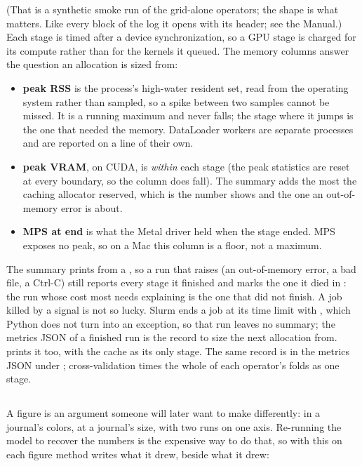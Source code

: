 (That is a synthetic smoke run of the grid-alone operators; the shape is what matters. Like every block of the log it opens with its \opt{[NAME]} header; see the Manual.) Each stage is timed after a device synchronization, so a GPU stage is charged for its compute rather than for the kernels it queued. The memory columns answer the question an allocation is sized from:

\begin{itemize}
  \item \textbf{peak RSS} is the process's high-water resident set, read from the operating system rather than sampled, so a spike between two samples cannot be missed. It is a running maximum and never falls; the stage where it jumps is the one that needed the memory. DataLoader workers are separate processes and are reported on a line of their own.
  \item \textbf{peak VRAM}, on CUDA, is  \emph{within} each stage (the peak statistics are reset at every boundary, so the column does fall). The summary adds the most the caching allocator reserved, which is the number  shows and the one an out-of-memory error is about.
  \item \textbf{MPS at end} is what the Metal driver held when the stage ended. MPS exposes no peak, so on a Mac this column is a floor, not a maximum.
\end{itemize}

The summary prints from a , so a run that raises (an out-of-memory error, a bad file, a Ctrl-C) still reports every stage it finished and marks the one it died in : the run whose cost most needs explaining is the one that did not finish. A job killed by a signal is not so lucky. Slurm ends a job at its time limit with , which Python does not turn into an exception, so that run leaves no summary; the metrics JSON of a finished run is the record to size the next allocation from.  prints it too, with the cache as its only stage. The same record is in the metrics JSON under ; cross-validation times the whole of each operator's folds as one stage.

\subsection{}

A figure is an argument someone will later want to make differently: in a journal's colors, at a journal's size, with two runs on one axis. Re-running the model to recover the numbers is the expensive way to do that, so with this on each figure method writes what it drew, beside what it drew:

